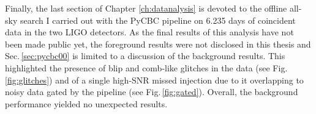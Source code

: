 \documentclass[binding=0.6cm, LaM]{sapthesis}
\begin{document}
	Finally, the last section of Chapter \ref{ch:datanalysis}
	is devoted to the offline all-sky search I carried out with the {\ttfamily PyCBC} pipeline on
        6.235 days of coincident data in the two LIGO detectors.
        As the final results of this analysis have not been made public yet, 
	the foreground results were not disclosed in this thesis and Sec.\,\ref{sec:pycbc00} is limited to a discussion of the background results.
        This highlighted the presence of blip and comb-like glitches in the data (see Fig.\,\ref{fig:glitches}) 
	and of a single high-SNR missed injection due to it overlapping to noisy data gated by the pipeline (see Fig.\,\ref{fig:gated}).  
	Overall, the background performance yielded no unexpected results.

\backmatter
\cleardoublepage

\markboth{\bibname}{\bibname}


\end{document}
